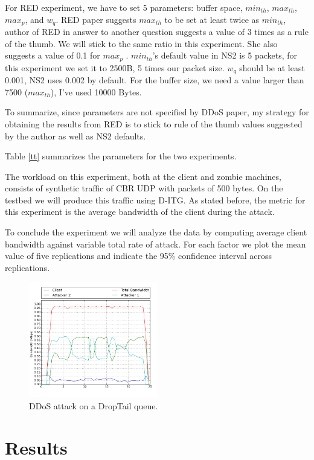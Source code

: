 \documentclass[12pt,twocolumn]{article}
\begin{document}
For RED experiment, we have to set 5 parameters: buffer space, $min_{th}$, $max_{th}$, $max_p$, and $w_q$.
RED paper suggests $max_{th}$ to be set at least twice as $min_{th}$, author of RED in answer to another question \cite{red} suggests a value of 3 times as a rule of the thumb.
We will stick to the same ratio in this experiment.
She also suggests a value of 0.1 for $max_p$ \cite{red}.
$min_{th}$’s default value in NS2 is 5 packets, for this experiment we set it to 2500B, 5 times our packet size.
$w_q$ should be at least 0.001, NS2 uses 0.002 by default. For the buffer size, we need a value larger than 7500 ($max_{th}$), I've used 10000 Bytes.

To summarize, since parameters are not specified by DDoS paper, my strategy for obtaining the results from RED is to stick to rule of the thumb values suggested by the author as well as NS2 defaults.

Table \ref{tt} summarizes the parameters for the two experiments.

The workload on this experiment, both at the client and zombie machines, consists of synthetic traffic of CBR UDP with packets of 500 bytes.
On the testbed we will produce this traffic using D-ITG.
As stated before, the metric for this experiment is the average bandwidth of the client during the attack.

To conclude the experiment we will analyze the data by computing average client bandwidth against variable total rate of attack.
For each factor we plot the mean value of five replications and indicate the 95\% confidence interval across replications. 

\begin{figure}[b!]
    \centering
    \includegraphics[width=0.5\textwidth]{../Results/tbf.png} \caption{DDoS attack on a DropTail queue.} \label{tbf1}
\end{figure}

\section{Results}
\end{document}
